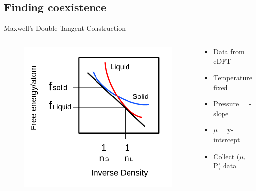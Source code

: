 \documentclass{beamer}
\begin{document}
\subsection*{Finding coexistence}
\begin{frame}{Maxwell's Double Tangent Construction}
	\begin{columns}[t]
        \begin{figure}
            \centering
            \includegraphics[width=\columnwidth]{figs/MaxwellDTC-Fig1.pdf}
          \end{figure}
		\begin{block}{}
			\begin{itemize}
				\item Data from cDFT 
				\item Temperature fixed
				\item Pressure = -slope
				\item $\mu$ = y-intercept
				\item Collect ($\mu$, P) data
			\end{itemize}
	    \end{block}
	\end{columns}	
\end{frame}
\end{document}
